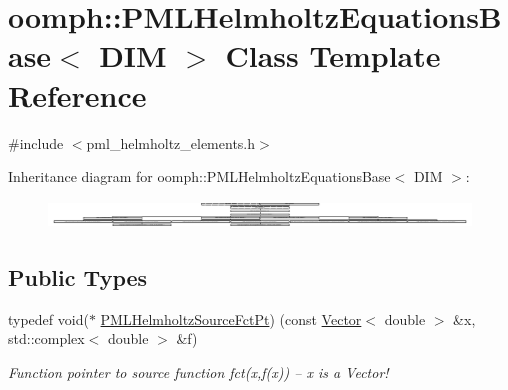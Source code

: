 \hypertarget{classoomph_1_1PMLHelmholtzEquationsBase}{}\section{oomph\+:\+:P\+M\+L\+Helmholtz\+Equations\+Base$<$ D\+IM $>$ Class Template Reference}
\label{classoomph_1_1PMLHelmholtzEquationsBase}


{\ttfamily \#include $<$pml\+\_\+helmholtz\+\_\+elements.\+h$>$}

Inheritance diagram for oomph\+:\+:P\+M\+L\+Helmholtz\+Equations\+Base$<$ D\+IM $>$\+:\begin{figure}[H]
\begin{center}
\leavevmode
\includegraphics[height=0.746667cm]{classoomph_1_1PMLHelmholtzEquationsBase}
\end{center}
\end{figure}
\subsection*{Public Types}
\begin{DoxyCompactItemize}
\item 
typedef void($\ast$ \hyperlink{classoomph_1_1PMLHelmholtzEquationsBase_abf57477abc2672cd680742e17721a07f}{P\+M\+L\+Helmholtz\+Source\+Fct\+Pt}) (const \hyperlink{classoomph_1_1Vector}{Vector}$<$ double $>$ \&x, std\+::complex$<$ double $>$ \&f)
\begin{DoxyCompactList}\small\item\em Function pointer to source function fct(x,f(x)) -- x is a Vector! \end{DoxyCompactList}\end{DoxyCompactItemize}
